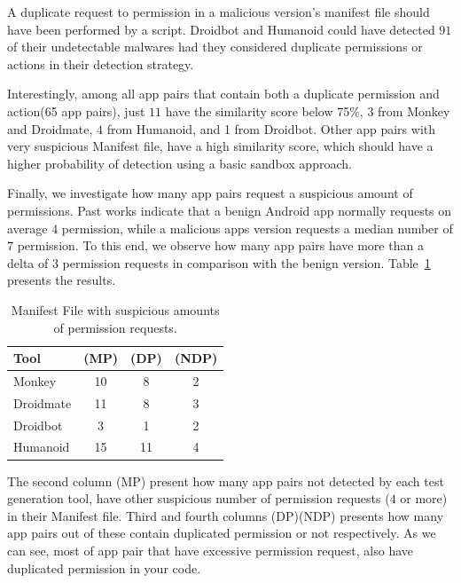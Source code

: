 A duplicate request to permission in a malicious version's manifest file should have been performed by a script.  Droidbot and Humanoid could have detected $91$ of their undetectable malwares had they considered duplicate permissions or actions in their detection strategy.  

Interestingly, among all app pairs  that contain both a duplicate permission and action(65 app pairs), just $11$ have the similarity score below 75\%, $3$ from Monkey and Droidmate, $4$ from Humanoid, and 1 from Droidbot. Other app pairs with very suspicious Manifest file, have a high similarity score, which should have a higher probability of detection using a basic sandbox approach.

Finally, we investigate how many app pairs request a suspicious amount of permissions. Past works indicate that a benign Android app normally requests on average $4$ permission, while a malicious apps version requests a median number of $7$ permission\cite{DBLP:conf/soups/FeltHEHCW12}\cite{DBLP:journals/tifs/0029LBKTLC17}. To this end, we observe how many app pairs have more than a delta of $3$ permission requests in comparison with the benign version. Table~\ref{tab:mp} presents the results.

\begin{table}[ht]
  \caption{Manifest File with suspicious amounts of permission requests.}
  \centering
  \begin{small}
 \begin{tabular}{lccc}
   \toprule
   Tool & (MP) & (DP) & (NDP) \\   \midrule
   Monkey &  10 & 8 & 2 \\ 
   Droidmate &  11 & 8 & 3 \\ 
   Droidbot &  3 & 1 & 2 \\ 
   Humanoid &  15 & 11 & 4 \\ 
 \bottomrule
 \end{tabular}
 \end{small}
 \label{tab:mp}
\end{table}

The second column (MP) present how many app pairs not detected by each test generation tool, have other suspicious number of permission requests ($4$ or more) in their Manifest file. Third and fourth columns (DP)(NDP) presents how many app pairs out of these contain duplicated permission or not respectively. As we can see, most of app pair that have excessive permission request, also have duplicated permission in your code. 



